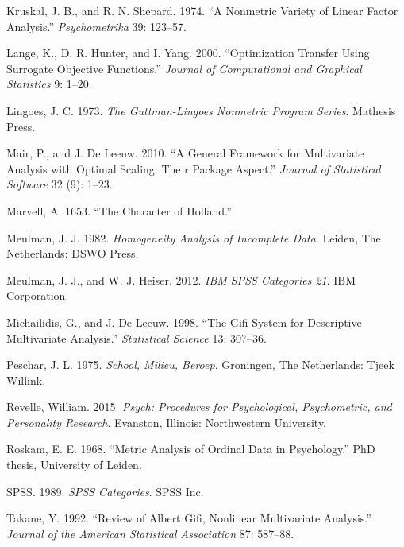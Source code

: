 \documentclass[
  12pt,
  letterpaper,
]{scrbook}
\newlength{\cslhangindent}
\newenvironment{CSLReferences}[2] %
 {\begin{list}{}{%
  \setlength{\itemindent}{0pt}
  \setlength{\leftmargin}{0pt}
  \setlength{\parsep}{0pt}
  \ifodd #1
   \setlength{\leftmargin}{\cslhangindent}
   \setlength{\itemindent}{-1\cslhangindent}
  \fi
  \setlength{\itemsep}{#2\baselineskip}}}
 {\end{list}}
\begin{document}
\begin{CSLReferences}{1}{0}
Kruskal, J. B., and R. N. Shepard. 1974. {``{A Nonmetric Variety of
Linear Factor Analysis}.''} \emph{Psychometrika} 39: 123--57.

Lange, K., D. R. Hunter, and I. Yang. 2000. {``{Optimization Transfer
Using Surrogate Objective Functions}.''} \emph{Journal of Computational
and Graphical Statistics} 9: 1--20.

Lingoes, J. C. 1973. \emph{{The Guttman-Lingoes Nonmetric Program
Series}}. Mathesis Press.

Mair, P., and J. De Leeuw. 2010. {``A General Framework for Multivariate
Analysis with Optimal Scaling: The r Package Aspect.''} \emph{Journal of
Statistical Software} 32 (9): 1--23.

Marvell, A. 1653. {``The Character of Holland.''}

Meulman, J. J. 1982. \emph{{Homogeneity Analysis of Incomplete Data}}.
Leiden, The Netherlands: {DSWO} Press.

Meulman, J. J., and W. J. Heiser. 2012. \emph{IBM SPSS Categories 21}.
IBM Corporation.

Michailidis, G., and J. De Leeuw. 1998. {``The Gifi System for
Descriptive Multivariate Analysis.''} \emph{Statistical Science} 13:
307--36.

Peschar, J. L. 1975. \emph{{School, Milieu, Beroep}}. Groningen, The
Netherlands: Tjeek Willink.

Revelle, William. 2015. \emph{Psych: Procedures for Psychological,
Psychometric, and Personality Research}. Evanston, Illinois:
Northwestern University.

Roskam, E. E. 1968. {``{Metric Analysis of Ordinal Data in
Psychology}.''} PhD thesis, University of Leiden.

SPSS. 1989. \emph{SPSS Categories}. SPSS Inc.

Takane, Y. 1992. {``{Review of Albert Gifi, Nonlinear Multivariate
Analysis}.''} \emph{Journal of the American Statistical Association} 87:
587--88.


\end{CSLReferences}
\end{document}
